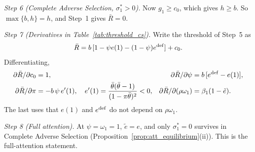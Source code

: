 \emph{Step 6 (Complete Adverse Selection, $\sigma_1^*>0$).} Now $g_1\ge c_0$, which gives $h\ge b$. So $\max\{b,h\}=h$, and Step~1 gives $\bar R=0$.

\emph{Step 7 (Derivatives in Table~\ref{tab:threshold_cs}).} Write the threshold of Step~5 as
\begin{equation*}
    \bar R=b\,[1-\psi e(1)-(1-\psi)e^{\rm def}]+c_0.
\end{equation*}
Differentiating,
\begin{align*}
    \partial\bar R/\partial c_0&=1, & \partial\bar R/\partial\psi&=b\,[e^{\rm def}-e(1)],\\
    \partial\bar R/\partial\pi&=-b\,\psi\,e'(1),\quad e'(1)=\frac{\bar\theta(\bar\theta-1)}{(1-\pi\bar\theta)^2}<0, & \partial\bar R/\partial(\rho\omega_1)&=\beta_1(1-\tilde e).
\end{align*}
The last uses that $e(1)$ and $e^{\rm def}$ do not depend on $\rho\omega_1$.

\emph{Step 8 (Full attention).} At $\psi=\omega_1=1$, $\tilde e=e$, and only $\sigma_1^*=0$ survives in Complete Adverse Selection (Proposition~\ref{prop:att_equilibrium}(ii)). This is the full-attention statement.
